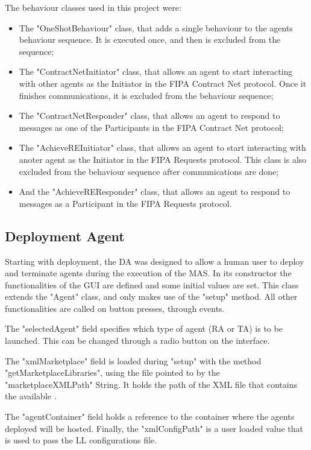 The behaviour classes used in this project were:
\begin{itemize}
	\item The "OneShotBehaviour" class, that adds a single behaviour to the agents behaviour sequence. It is executed once, and then is excluded from the sequence;
	\item The "ContractNetInitiator" class, that allows an agent to start interacting with other agents as the Initiator in the \acrshort{FIPA} Contract Net protocol. Once it finishes communications, it is excluded from the behaviour sequence;
	\item The "ContractNetResponder" class, that allows an agent to respond to messages as one of the Participants in the \acrshort{FIPA} Contract Net protocol; 
	\item The "AchieveREInitiator" class, that allows an agent to start interacting with anoter agent as the Initiator in the \acrshort{FIPA} Requests protocol. This class is also excluded from the behaviour sequence after communications are done;
	\item And the "AchieveREResponder" class, that allows an agent to respond to messages as a Participant in the \acrshort{FIPA} Requests protocol.
\end{itemize}

\subsection{Deployment Agent}
\label{subsec:deployment_agent}

Starting with deployment, the \acrlong{DA} was designed to allow a human user to deploy and terminate agents during the execution of the \acrshort{MAS}. In its constructor the functionalities of the \acrshort{GUI} are defined and some initial values are set. This class extends the "Agent" class, and only makes use of the "setup" method. All other functionalities are called on button presses, through events.

The "selectedAgent" field specifies which type of agent (\acrshort{RA} or \acrshort{TA}) is to be launched. This can be changed through a radio button on the interface.

The "xmlMarketplace" field is loaded during "setup" with the method "getMarketplaceLibraries", using the file pointed to by the "marketplaceXMLPath" String. It holds the path of the \acrshort{XML} file that contains the available .

The "agentContainer" field holds a reference to the container where the agents deployed will be hosted. Finally, the "xmlConfigPath" is a user loaded value that is used to pass the \acrshort{LL} configurations file.\\

